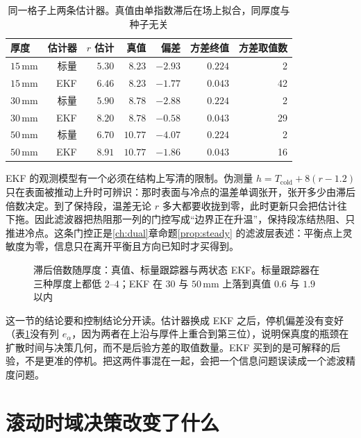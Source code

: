 \begin{table}[htbp]
\centering
\caption{同一格子上两条估计器。真值由单指数滞后在场上拟合，同厚度与种子无关}
\label{tab:est}
\setlength{\tabcolsep}{2.6pt}
{\footnotesize
\begin{tabular}{lrrrrrr}
\toprule
厚度 & 估计器 & \(r\) 估计 & 真值 & 偏差 & 方差终值 & 方差取值数 \\
\midrule
\(15\,\mathrm{mm}\) & 标量 & \(5.30\) & \(8.23\) & \(-2.93\) & \(0.224\) & 2 \\
\(15\,\mathrm{mm}\) & EKF & \(6.46\) & \(8.23\) & \(-1.77\) & \(0.043\) & 42 \\
\(30\,\mathrm{mm}\) & 标量 & \(5.90\) & \(8.78\) & \(-2.88\) & \(0.224\) & 2 \\
\(30\,\mathrm{mm}\) & EKF & \(8.20\) & \(8.78\) & \(-0.58\) & \(0.043\) & 29 \\
\(50\,\mathrm{mm}\) & 标量 & \(6.70\) & \(10.77\) & \(-4.07\) & \(0.224\) & 2 \\
\(50\,\mathrm{mm}\) & EKF & \(8.91\) & \(10.77\) & \(-1.86\) & \(0.043\) & 16 \\
\bottomrule
\end{tabular}}
\end{table}

EKF 的观测模型有一个必须在结构上写清的限制。伪测量 \(h=T_{\mathrm{cold}}+8(r-1.2)\) 只在表面被推动上升时可辨识：那时表面与冷点的温差单调张开，张开多少由滞后倍数决定。到了保持段，温差无论 \(r\) 多大都要收拢到零，此时更新只会把估计往下拖。因此滤波器把热阻那一列的门控写成“边界正在升温”，保持段冻结热阻、只推进冷点。这条门控正是\ref{ch:dual}{}章命题\ref{prop:steady} 的滤波层表述：平衡点上灵敏度为零，信息只在离开平衡且方向已知时才买得到。

\begin{figure}[htbp]
\centering
{}
\caption{滞后倍数随厚度：真值、标量跟踪器与两状态 EKF。标量跟踪器在三种厚度上都低 \(2\)--\(4\)；EKF 在 \(30\) 与 \(50\,\mathrm{mm}\) 上落到真值 \(0.6\) 与 \(1.9\) 以内}
\label{fig:ident}
\end{figure}

这一节的结论要和控制结论分开读。估计器换成 EKF 之后，停机偏差没有变好（表\ref{tab:est}{}没有列 \(e_{\alpha}\)，因为两者在上沿与厚件上重合到第三位），说明保真度的瓶颈在扩散时间与决策几何，而不是后验方差的取值数量。EKF 买到的是可解释的后验，不是更准的停机。把这两件事混在一起，会把一个信息问题误读成一个滤波精度问题。

\section{滚动时域决策改变了什么}
\label{ch:mpcpolicy}

